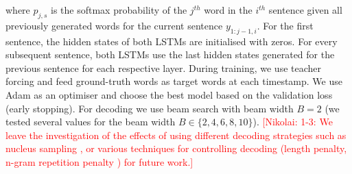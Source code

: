 \documentclass[11pt,a4paper]{article}
\newcommand{\kibitz}[2]{\ifnum\Comments=1\textcolor{#1}{#2}\fi}
\newcommand{\nikolai}[1]{\kibitz{red}  {[Nikolai: #1]}}
\begin{document}
where $p_{j,s}$ is the softmax probability of the $j^{th}$ word in the $i^{th}$ sentence given all previously generated words for the current sentence $y_{1:j-1,i}$.
For the first sentence, the hidden states of both LSTMs are initialised with zeros.
For every subsequent sentence, both LSTMs use the last hidden states generated for the previous sentence for each respective layer.
During training, we use teacher forcing and feed ground-truth words as target words at each timestamp.
We use Adam \cite{adam14} as an optimiser and choose the best model based on the validation loss (early stopping).
For decoding we use beam search \cite{beam17} with beam width $B=2$ (we tested several values for the beam width $B \in \{2, 4, 6, 8, 10\}$).
\nikolai{1-3: We leave the investigation of the effects of using different decoding strategies such as nucleus sampling \cite{Holtzman2019}, or various techniques for controlling decoding (length penalty, n-gram repetition penalty \cite{opennmt2017,paulus2017deep}) for future work.}








\end{document}
